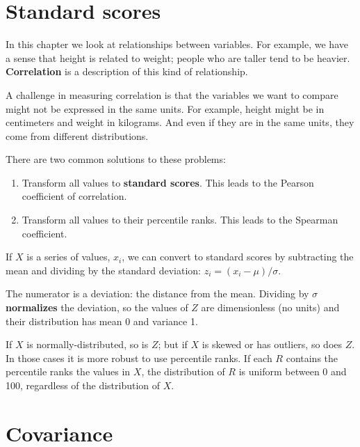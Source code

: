 \documentclass[12pt]{book}
\begin{document}
\section{Standard scores}

In this chapter we look at relationships between variables.  For
example, we have a sense that height is related to weight; people who
are taller tend to be heavier.  {\bf Correlation} is a description of
this kind of relationship.

A challenge in measuring correlation is that the variables we want
to compare might not be expressed in the same units.  For example, height
might be in centimeters and weight in kilograms.  And even if they are
in the same units, they come from different distributions.

There are two common solutions to these problems:

\begin{enumerate}

\item Transform all values to {\bf standard scores}.  This leads to
the Pearson coefficient of correlation.


\item Transform all values to their percentile ranks.  This
leads to the Spearman coefficient.

\end{enumerate}

If $X$ is a series of values, $x_i$, we can convert to standard
scores by subtracting the mean and dividing by the standard deviation:
$z_i = (x_i - \mu) / \sigma$.

The numerator is a deviation: the distance from the mean.  Dividing by
$\sigma$ {\bf normalizes} the deviation, so the values of $Z$ are
dimensionless (no units) and their distribution has mean 0 and
variance 1.


If $X$ is normally-distributed, so is $Z$; but if $X$ is skewed or has
outliers, so does $Z$.  In those cases it is more robust to use
percentile ranks.  If each $R$ contains the percentile ranks the
values in $X$, the distribution of $R$ is uniform between 0 and 100,
regardless of the distribution of $X$.


\section{Covariance}
\end{document}
